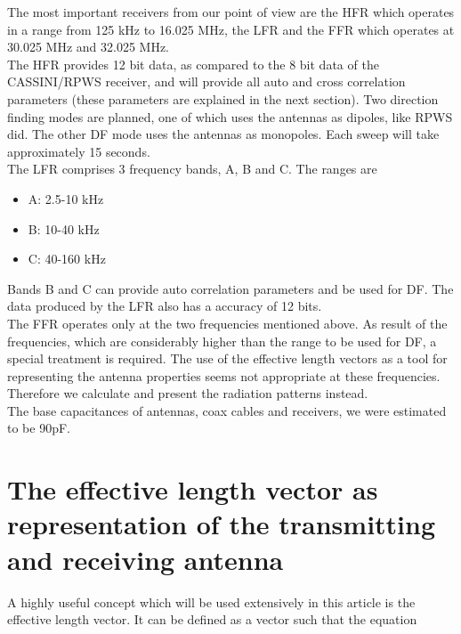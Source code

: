 \documentclass[galley,ras]{agu2001}
\begin{document}
\begin{article}
The most important receivers from our point of view are the HFR which operates in a range from 125 kHz to 16.025 MHz, the LFR and the FFR which operates at 30.025 MHz and 32.025 MHz.\\

The HFR provides 12 bit data, as compared to the 8 bit data of the CASSINI/RPWS receiver, and will provide all auto and cross correlation parameters (these parameters are explained in the next section). Two direction finding modes are planned, one of which uses the antennas as dipoles, like RPWS did. The other DF mode uses the antennas as monopoles. Each sweep will take approximately 15 seconds. \\

The LFR comprises 3 frequency bands, A, B and C. The ranges are\\

\begin{itemize}
    \item A: 2.5-10 kHz\\
\item B: 10-40 kHz\\
\item C: 40-160 kHz\\
\end{itemize}

Bands B and C can provide auto correlation parameters and be used for DF. The data produced by the LFR also has a accuracy of 12 bits.\\

The FFR operates only at the two frequencies mentioned above. As result of the frequencies, which are considerably higher than the range to be used for DF, a special treatment is required. The use of the effective length vectors as a tool for representing the antenna properties seems not appropriate at these frequencies. Therefore we calculate and present the radiation patterns instead.\\

The base capacitances of antennas, coax cables and receivers, we were estimated to be 90pF.\\

\section{The effective length vector as representation of the transmitting and receiving antenna}
A highly useful concept which will be used extensively in this article is the effective length vector. It can be defined as a vector such that the equation



\end{article}
\end{document}
